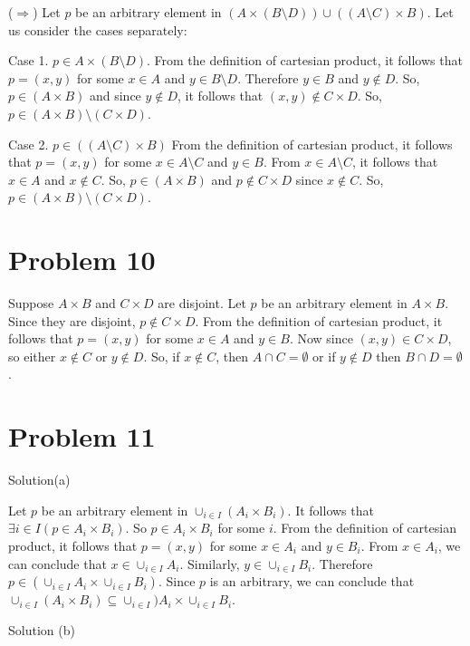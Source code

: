 \documentclass{article}
\begin{document}
($ \Rightarrow $) Let $p$ be an arbitrary element in $(A \times (B
\setminus D)) \cup ((A \setminus C) \times B)$. Let us consider the
cases separately:

Case 1. $p \in A \times (B \setminus D)$. From the definition of
cartesian product, it follows that $p = (x,y)$ for some $x \in A$ and
$y \in B \setminus D$. Therefore $y \in B$ and $y \notin D$. So, $p
\in (A \times B)$ and since $ y \notin D$, it follows that $(x,y)
\notin C \times D$. So, $p \in (A \times B) \setminus (C \times D)$.

Case 2. $p \in ((A \setminus C) \times B)$ From the definition of
cartesian product, it follows that $p = (x,y)$ for some $x \in A
\setminus C$ and $y \in B$. From $x \in A \setminus C$, it follows
that $x \in A$ and $x \notin C$. So, $p \in (A \times B)$ and $p
\notin C \times D$ since $x \notin C$. So, $p \in (A \times B)
\setminus (C \times D)$.

\section{Problem 10}

Suppose $A \times B$ and $C \times D$ are disjoint. Let $p$ be an
arbitrary element in $A \times B$. Since they are disjoint, $p \notin
C \times D$. From the definition of cartesian product, it follows that
$p = (x,y)$ for some $x \in A$ and $y \in B$. Now since $(x,y) \in C
\times D$, so either $x \notin C$ or $y \notin D$. So, if $x \notin
C$, then $A \cap C = \emptyset$ or if $y \notin D$ then $B \cap D = \emptyset$.

\section{Problem 11}

Solution(a)

Let $p$ be an arbitrary element in $\cup_{i \in I} (A_i \times B_i)$.
It follows that $\exists i \in I(p \in A_i \times B_i)$. So $p \in A_i
\times B_i$ for some $i$. From the definition of cartesian product, it
follows that $p = (x,y)$ for some $x \in A_i$ and $y \in B_i$. From $x
\in A_i$, we can conclude that $x \in \cup_{i \in I} A_i$. Similarly,
$y \in \cup_{i \in I} B_i$. Therefore $p \in (\cup_{i \in I}A_i \times
\cup_{i \in I}B_i)$. Since $p$ is an arbitrary, we can conclude that
$\cup_{i \in I}(A_i \times B_i) \subseteq \cup_{i \in I})A_i \times
\cup_{i \in I} B_i$.

Solution (b)
\end{document}
